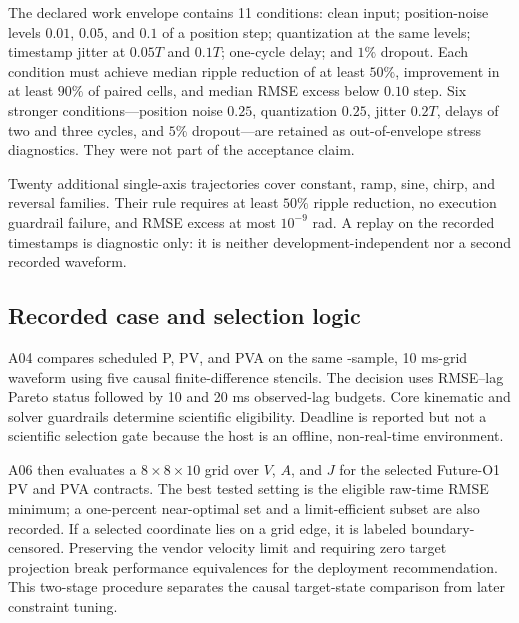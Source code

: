 The declared work envelope contains 11 conditions: clean input; position-noise levels $0.01$, $0.05$, and $0.1$ of a position step; quantization at the same levels; timestamp jitter at $0.05T$ and $0.1T$; one-cycle delay; and $1\%$ dropout. Each condition must achieve median ripple reduction of at least $50\%$, improvement in at least $90\%$ of paired cells, and median RMSE excess below $0.10$ step. Six stronger conditions---position noise $0.25$, quantization $0.25$, jitter $0.2T$, delays of two and three cycles, and $5\%$ dropout---are retained as out-of-envelope stress diagnostics. They were not part of the acceptance claim.

Twenty additional single-axis trajectories cover constant, ramp, sine, chirp, and reversal families. Their rule requires at least $50\%$ ripple reduction, no execution guardrail failure, and RMSE excess at most $10^{-9}$ rad. A replay on the recorded timestamps is diagnostic only: it is neither development-independent nor a second recorded waveform.

\subsection{Recorded case and selection logic}

A04 compares scheduled P, PV, and PVA on the same \RecordedSampleCount{}-sample, 10 ms-grid waveform using five causal finite-difference stencils. The decision uses RMSE--lag Pareto status followed by 10 and 20 ms observed-lag budgets. Core kinematic and solver guardrails determine scientific eligibility. Deadline is reported but not a scientific selection gate because the host is an offline, non-real-time environment.

A06 then evaluates a $8\times8\times10$ grid over $V$, $A$, and $J$ for the selected Future-O1 PV and PVA contracts. The best tested setting is the eligible raw-time RMSE minimum; a one-percent near-optimal set and a limit-efficient subset are also recorded. If a selected coordinate lies on a grid edge, it is labeled boundary-censored. Preserving the vendor velocity limit and requiring zero target projection break performance equivalences for the deployment recommendation. This two-stage procedure separates the causal target-state comparison from later constraint tuning.

